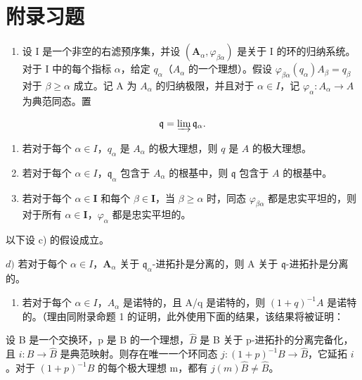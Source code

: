 \section*{附录习题}
{}

\begin{enumerate}
\def\labelenumi{\arabic{enumi})}
\tightlist
\item
  设 I 是一个非空的右滤预序集，并设 \((\mathbf{A}_{\alpha}, \varphi_{\beta\alpha})\) 是关于 I 的环的归纳系统。对于 I 中的每个指标 \(\alpha\)，给定 \(q_{\alpha}\)（\(A_{\alpha}\) 的一个理想）。假设 \(\varphi_{\beta\alpha}(q_{\alpha}) A_{\beta} = q_{\beta}\) 对于 \(\beta \geqslant \alpha\) 成立。记 A 为 \(A_{\alpha}\) 的归纳极限，并且对于 \(\alpha \in I\)，记 \(\varphi_{\alpha}: A_{\alpha} \to A\) 为典范同态。置
\end{enumerate}

\[
\mathfrak {q} = \varinjlim \mathfrak {q} _ {\alpha}.
\]

\begin{enumerate}
\def\labelenumi{\alph{enumi})}
\item
  若对于每个 \(\alpha \in I\)，\(q_{\alpha}\) 是 \(A_{\alpha}\) 的极大理想，则 \(q\) 是 \(A\) 的极大理想。
\item
  若对于每个 \(\alpha \in I\)，\(\mathfrak{q}_{\alpha}\) 包含于 \(A_{\alpha}\) 的根基中，则 \(\mathfrak{q}\) 包含于 \(A\) 的根基中。
\item
  若对于每个 \(\alpha\in\mathbf{I}\) 和每个 \(\beta\in\mathbf{I}\)，当 \(\beta\geqslant\alpha\) 时，同态 \(\varphi_{\beta\alpha}\) 都是忠实平坦的，则对于所有 \(\alpha\in\mathbf{I}\)，\(\varphi_{\alpha}\) 都是忠实平坦的。
\end{enumerate}

以下设 c) 的假设成立。

\(d)\) 若对于每个 \(\alpha\in I\)，\(\mathbf{A}_{\alpha}\) 关于 \(\mathfrak{q}_{\alpha}\)-进拓扑是分离的，则 A 关于 \(\mathfrak{q}\)-进拓扑是分离的。

\begin{enumerate}
\def\labelenumi{\alph{enumi})}
\setcounter{enumi}{4}
\tightlist
\item
  若对于每个 \(\alpha \in I\)，\(A_{\alpha}\) 是诺特的，且 A/q 是诺特的，则 \((1 + q)^{-1}A\) 是诺特的。（理由同附录命题 1 的证明，此外使用下面的结果，该结果将被证明：
\end{enumerate}

设 B 是一个交换环，p 是 B 的一个理想，\(\widehat{B}\) 是 B 关于 p-进拓扑的分离完备化，且 \(i: B \to \widehat{B}\) 是典范映射。则存在唯一一个环同态 \(j: (1 + p)^{-1}B \to \widehat{B}\)，它延拓 \(i\)。对于 \((1 + p)^{-1}B\) 的每个极大理想 m，都有 \(j(m)\widehat{B} \neq \widehat{B}\)。

